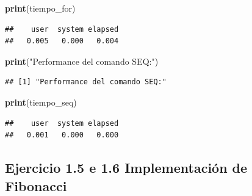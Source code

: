 \documentclass[]{llncs}
\newenvironment{Shaded}{\begin{snugshade}}{\end{snugshade}}
\newcommand{\FunctionTok}[1]{\textcolor[rgb]{0.13,0.29,0.53}{\textbf{#1}}}
\newcommand{\NormalTok}[1]{#1}
\newcommand{\StringTok}[1]{\textcolor[rgb]{0.31,0.60,0.02}{#1}}
\begin{document}
\begin{Shaded}
\begin{Highlighting}[]
\FunctionTok{print}\NormalTok{(tiempo\_for)}
\end{Highlighting}
\end{Shaded}

\begin{verbatim}
##    user  system elapsed 
##   0.005   0.000   0.004
\end{verbatim}

\begin{Shaded}
\begin{Highlighting}[]
\FunctionTok{print}\NormalTok{(}\StringTok{"Performance del comando SEQ:"}\NormalTok{)}
\end{Highlighting}
\end{Shaded}

\begin{verbatim}
## [1] "Performance del comando SEQ:"
\end{verbatim}

\begin{Shaded}
\begin{Highlighting}[]
\FunctionTok{print}\NormalTok{(tiempo\_seq)}
\end{Highlighting}
\end{Shaded}

\begin{verbatim}
##    user  system elapsed 
##   0.001   0.000   0.000
\end{verbatim}

\subsection{Ejercicio 1.5 e 1.6 Implementación de
Fibonacci}\label{ejercicio-1.5-e-1.6-implementaciuxf3n-de-fibonacci}
\end{document}
